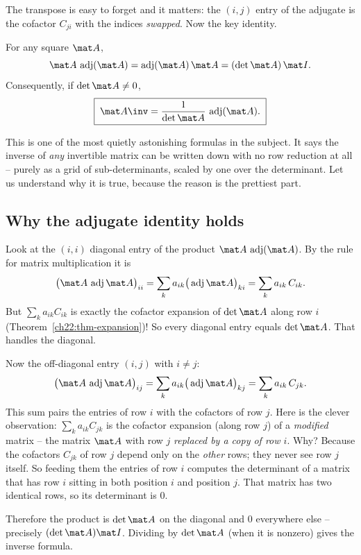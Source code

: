 The transpose is easy to forget and it matters: the $(i,j)$ entry of the adjugate is the cofactor
$C_{ji}$ with the indices \emph{swapped}. Now the key identity.

\begin{theorem}\label{ch22:thm-adj}
For any square $\mat A$,
\[
\mat A\,\operatorname{adj}(\mat A) = \operatorname{adj}(\mat A)\,\mat A = (\det\mat A)\,\mat I.
\]
Consequently, if $\det\mat A\neq 0$,
\[
\boxed{\;\mat A\inv = \frac{1}{\det\mat A}\,\operatorname{adj}(\mat A).\;}
\]
\end{theorem}

This is one of the most quietly astonishing formulas in the subject. It says the inverse of \emph{any}
invertible matrix can be written down with no row reduction at all -- purely as a grid of
sub-determinants, scaled by one over the determinant. Let us understand why it is true, because the
reason is the prettiest part.

\subsection{Why the adjugate identity holds}

Look at the $(i,i)$ diagonal entry of the product $\mat A\,\operatorname{adj}(\mat A)$. By the rule
for matrix multiplication it is
\[
\big(\mat A\,\operatorname{adj}\mat A\big)_{ii}
=\sum_{k} a_{ik}\big(\operatorname{adj}\mat A\big)_{ki}
=\sum_{k} a_{ik}\,C_{ik}.
\]
But $\sum_k a_{ik}C_{ik}$ is exactly the cofactor expansion of $\det\mat A$ along row $i$
(Theorem~\ref{ch22:thm-expansion})! So every diagonal entry equals $\det\mat A$. That handles the
diagonal.

Now the off-diagonal entry $(i,j)$ with $i\neq j$:
\[
\big(\mat A\,\operatorname{adj}\mat A\big)_{ij}
=\sum_{k} a_{ik}\big(\operatorname{adj}\mat A\big)_{kj}
=\sum_{k} a_{ik}\,C_{jk}.
\]
This sum pairs the entries of row $i$ with the cofactors of row $j$. Here is the clever observation:
$\sum_k a_{ik}C_{jk}$ is the cofactor expansion (along row $j$) of a \emph{modified} matrix -- the
matrix $\mat A$ with row $j$ \emph{replaced by a copy of row $i$}. Why? Because the cofactors $C_{jk}$
of row $j$ depend only on the \emph{other} rows; they never see row $j$ itself. So feeding them the
entries of row $i$ computes the determinant of a matrix that has row $i$ sitting in both position $i$
and position $j$. That matrix has two identical rows, so its determinant is $0$.

Therefore the product is $\det\mat A$ on the diagonal and $0$ everywhere else -- precisely $(\det\mat
A)\mat I$. Dividing by $\det\mat A$ (when it is nonzero) gives the inverse formula.

